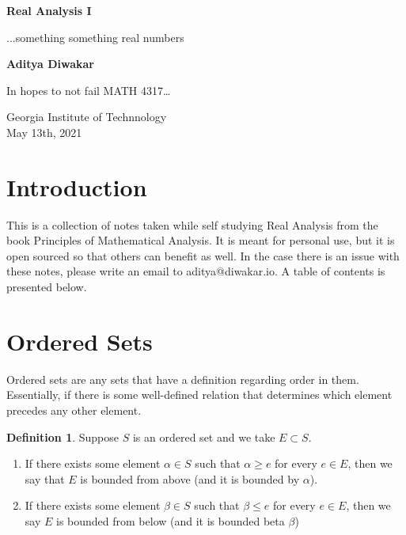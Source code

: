 \documentclass[14pt]{extarticle}
\theoremstyle{definition}
\newtheorem{definition}{Definition}[section]
\begin{document}
\begin{titlepage}
   \begin{center}
       \vspace*{1cm}

       \textbf{\LARGE Real Analysis I}

       \vspace{0.5cm}

       {\Large ...something something real numbers}
            
       \vspace{1.5cm}

       \textbf{\Large Aditya Diwakar}

       \vfill
            
       \large{In hopes to not fail MATH 4317\dots
            
       \vspace{0.8cm}
     
       Georgia Institute of Technnology\\
       May 13th, 2021}
            
   \end{center}
\end{titlepage}

\section{Introduction}
This is a collection of notes taken while self studying Real Analysis from the book Principles of 
Mathematical Analysis. It is meant for personal use, but it is open sourced so that others can benefit 
as well. In the case there is an issue with these notes, please write an email to aditya@diwakar.io. 
A table of contents is presented below.

\tableofcontents
\pagebreak
\setcounter{tocdepth}{3}

\section{Ordered Sets}
Ordered sets are any sets that have a definition regarding order in them. Essentially, if there is some
well-defined relation that determines which element precedes any other element.

\begin{definition}
    Suppose $S$ is an ordered set and we take $E \subset S$. 
    \begin{enumerate}[label=(\arabic*)]
        \item If there exists some element $\alpha\in S$ such that
        $\alpha \geq e$ for every $e\in E$, then we say that $E$ is bounded from above (and it is bounded by $\alpha$).

    \item If there exists some element $\beta \in S$ such that $\beta \leq e$ for every $e\in E$, then we say $E$ is bounded from below
        (and it is bounded beta $\beta$)
    \end{enumerate}

\end{definition}
\end{document}

